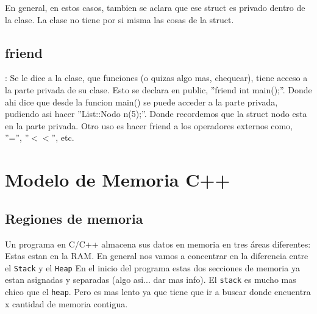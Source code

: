 \documentclass[11pt]{article}
\begin{document}
En general, en estos casos, tambien se aclara que ese struct es privado dentro
de la clase.
La clase no tiene por si misma las cosas de la struct.

\vspace{0.5cm}
\subsection{friend}: Se le dice a la clase, que funciones (o quizas algo mas, chequear),
tiene  acceso a la parte privada de su clase.
Esto se declara en public, ''friend int main();''.
Donde ahi dice que desde la funcion main() se puede acceder a la parte privada,
pudiendo asi hacer ''List::Nodo n(5);''.
Donde recordemos que la struct nodo esta en la parte privada.
Otro uso es hacer friend a los operadores externos como, ''='', ''$<<$'', etc.




\section{Modelo de Memoria C++}


\subsection{Regiones de memoria}
Un programa en C/C++ almacena sus datos en memoria en tres áreas diferentes:
Estas estan en la RAM.
En general nos vamos a concentrar en la diferencia entre el \texttt{Stack} y el \texttt{Heap}
En el inicio del programa estas dos secciones de memoria ya estan asignadas y
separadas (algo asi... dar mas info).
El \texttt{stack} es mucho mas chico que el \texttt{heap}.
Pero es mas lento ya que tiene que ir a buscar donde encuentra x cantidad de
memoria contigua.
\end{document}
